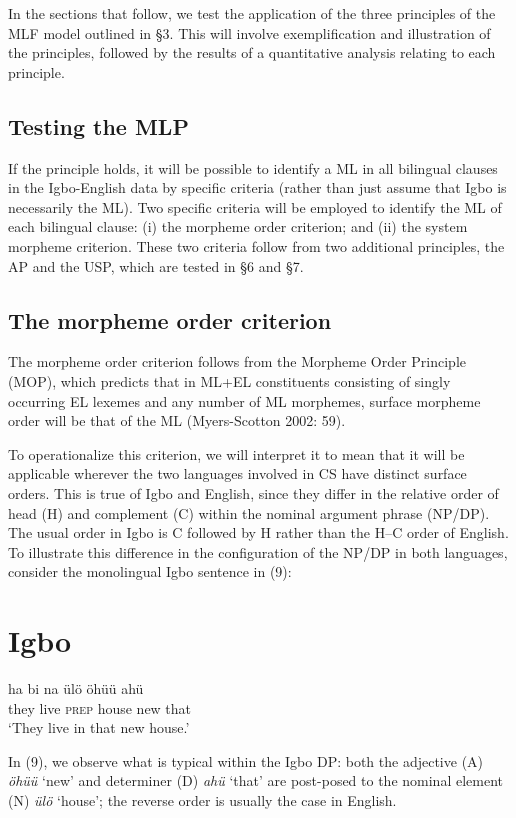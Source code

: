 \documentclass[output=paper]{langsci/langscibook}
\begin{document}
In the sections that follow, we test the application of the three principles of the MLF model outlined in §3. This will involve exemplification and illustration of the principles, followed by the results of a quantitative analysis relating to each principle. 

\section{ Testing the MLP }

If the principle holds, it will be possible to identify a ML in all bilingual clauses in the Igbo-English data by specific criteria (rather than just assume that Igbo is necessarily the ML). Two specific criteria will be employed to identify the ML of each bilingual clause: (i) the morpheme order criterion; and (ii) the system morpheme criterion. These two criteria follow from two additional principles, the AP and the USP, which are tested in §6 and §7.

\section{The morpheme order criterion}

The morpheme order criterion follows from the Morpheme Order Principle (MOP), which predicts that in ML+EL constituents consisting of singly occurring EL lexemes and any number of ML morphemes, surface morpheme order will be that of the ML (Myers-Scotton 2002: 59). 

To operationalize this criterion, we will interpret it to mean that it will be applicable wherever the two languages involved in CS have distinct surface orders. This is true of Igbo and English, since they differ in the relative order of head (H) and complement (C) within the nominal argument phrase (NP/DP). The usual order in Igbo is C followed by H rather than the H–C order of English. To illustrate this difference in the configuration of the NP/DP in both languages, consider the monolingual Igbo sentence in (9):

\chapter{Igbo}
\gll ha    bi  na   ülö  öhüü  ahü\\
     they  live  \textsc{prep}  house  new  that\\
\glt ‘They live in that new house.’
\z

In (9), we observe what is typical within the Igbo DP: both the adjective (A) \textit{öhüü} ‘new’ and determiner (D) \textit{ahü} ‘that’ are post-posed to the nominal element (N) \textit{ülö }‘house’; the reverse order is usually the case in English. 
\end{document}
